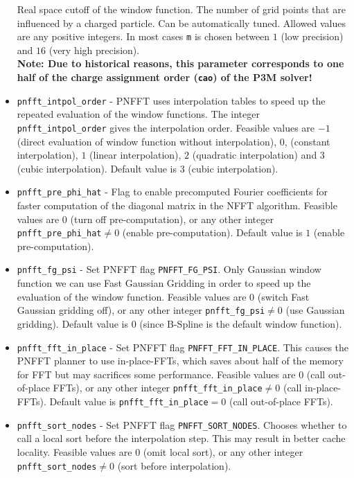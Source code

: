 \begin{itemize}
    Real space cutoff of the window function. The number of grid points that are influenced
    by a charged particle. Can be automatically tuned. Allowed values are any positive integers.
    In most cases \verb!m! is chosen between $1$ (low precision) and $16$ (very high precision).\\
    {\bfseries Note: Due to historical reasons, this parameter corresponds to one half of the charge assignment order
    (\verb!cao!) of the P3M solver!}
  \item \verb!pnfft_intpol_order! -
    PNFFT uses interpolation tables to speed up the repeated evaluation of the window functions. The integer \verb!pnfft_intpol_order! gives the interpolation order.
    Feasible values are $-1$ (direct evaluation of window function without interpolation), $0$, (constant interpolation), $1$ (linear interpolation), $2$ (quadratic interpolation) and $3$ (cubic interpolation).
    Default value is $3$ (cubic interpolation).
  \item \verb!pnfft_pre_phi_hat! -
    Flag to enable precomputed Fourier coefficients for faster computation of the diagonal matrix in the NFFT algorithm.
    Feasible values are $0$ (turn off pre-computation), or any other integer \verb!pnfft_pre_phi_hat!$\ne0$ (enable pre-computation).
    Default value is $1$ (enable pre-computation).
  \item \verb!pnfft_fg_psi! -
    Set PNFFT flag \verb!PNFFT_FG_PSI!. Only Gaussian window function we can use Fast Gaussian Gridding in order to speed up the evaluation of the window function.
    Feasible values are $0$ (switch Fast Gaussian gridding off), or any other integer \verb!pnfft_fg_psi!$\ne0$ (use Gaussian gridding).
    Default value is $0$ (since B-Spline is the default window function).
  \item \verb!pnfft_fft_in_place! -
    Set PNFFT flag \verb!PNFFT_FFT_IN_PLACE!. This causes the PNFFT planner to use in-place-FFTs, which saves about half of the memory for FFT but may sacrifices some performance.
    Feasible values are $0$ (call out-of-place FFTs), or any other integer \verb!pnfft_fft_in_place!$\ne0$ (call in-place-FFTs).
    Default value is \verb!pnfft_fft_in_place!$=0$ (call out-of-place FFTs).
  \item \verb!pnfft_sort_nodes! -
    Set PNFFT flag \verb!PNFFT_SORT_NODES!. Chooses whether to call a local sort before the interpolation step. This may result in better cache locality.
    Feasible values are $0$ (omit local sort), or any other integer \verb!pnfft_sort_nodes!$\ne0$ (sort before interpolation).

\end{itemize}
